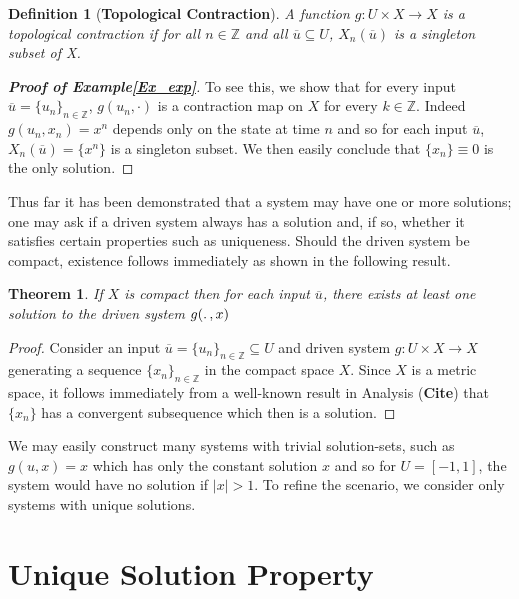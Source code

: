 \documentclass[a4paper,12pt,twoside]{book}
\newtheorem{Definition}{Definition}[]
\newtheorem{Theorem}{Theorem}[]
\begin{document}
\begin{Definition}
  [\bf Topological Contraction]\label{Dfn_TopContr}
  A function $g:U\times{X}\to{X}$ is a topological contraction if for all $n\in\mathbb{Z}$ and all $\overline{u}\subseteq{U}$, $X_n(\overline{u})$ is a singleton subset of X.  
\end{Definition}

\begin{proof}
  [\bf Proof of Example\ref{Ex_exp}] 
  To see this, we show that for every input $\overline{u}=\{u_n\}_{n\in\mathbb{Z}}$, $g(u_n,\cdot)$ is a contraction map on $X$ for every $k\in\mathbb{Z}$. 
  Indeed $g(u_n,x_n)=x^n$ depends only on the state at time $n$ and so for each input $\overline{u}$, $X_n(\overline{u})=\{x^n\}$ is a singleton subset.
  We then easily conclude that $\{x_n\}\equiv0$ is the only solution. 
\end{proof}

Thus far it has been demonstrated that a system may have one or more solutions; one may ask if a driven system always has a solution and, if so, whether it satisfies certain properties such as uniqueness. 
Should the driven system be compact, existence follows immediately as shown in the following result.

\begin{Theorem}\label{Thm_CompactExistence}
  If $X$ is compact then for each input $\overline{u}$, there exists at least one solution to the driven system $g(\ldotp, x)$
\end{Theorem}
\begin{proof}
  Consider an input $\overline{u}={\{u_n\}}_{n\in\mathbb{Z}}\subseteq{U}$ and driven system $g:U\times{X}\to{X}$  generating a sequence ${\{x_n\}}_{n\in\mathbb{Z}}$ in the compact space $X$. 
  Since $X$ is a metric space, it follows immediately from a well-known result in Analysis (\textbf{Cite}) that $\{x_n\}$ has a convergent subsequence which then is a solution. 
\end{proof}

We may easily construct many systems with trivial solution-sets, such as $g(u,x)=x$ which has only the constant solution $x$ and so for $U=[-1,1]$, the system would have no solution if $|x|>1$. To refine the scenario, we consider only systems with unique solutions. 

\section {Unique Solution Property}
\end{document}
